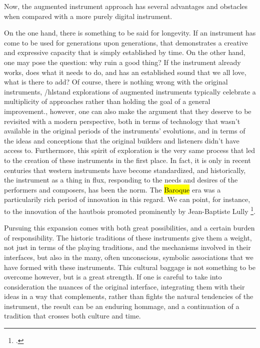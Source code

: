 \documentclass[12pt,twoside,maitrise]{dms_ks}
\theoremstyle{definition}
\begin{document}

Now, the augmented instrument approach has several advantages and obstacles when compared with a more purely digital instrument. 

On the one hand, there is something to be said for longevity.
If an instrument has come to be used for generations upon generations, that demonstrates a creative and expressive capacity that is simply established by time.
On the other hand, one may pose the question: why ruin a good thing?
If the instrument already works, does what it needs to do, and has an established sound that we all love, what is there to add?
Of course, there is nothing wrong with the original instruments, /hlst{and explorations of augmented instruments typically celebrate a multiplicity of approaches rather than holding the goal of a general improvement.}, however, one can also make the argument that they deserve to be revisited with a modern perspective, both in terms of technology that wasn't available in the original periods of the instruments' evolutions, and in terms of the ideas and conceptions that the original builders and listeners didn't have access to. 
Furthermore, this spirit of exploration is the very same process that led to the creation of these instruments in the first place.
In fact, it is only in recent centuries that western instruments have become standardized, and historically, the instrument as a thing in flux, responding to the needs and desires of the performers and composers, has been the norm.
The \hl{Baroque} era was a particularily rich period of innovation in this regard.
We can point, for instance, to the innovation of the hautbois promoted prominently by Jean-Baptiste Lully \footcite{wainwright_renaissance_2017}.


Pursuing this expansion comes with both great possibilities, and a certain burden of responsibility.
The historic traditions of these instruments give them a weight, not just in terms of the playing traditions, and the mechanisms involved in their interfaces, but also in the many, often unconscious, symbolic associations that we have formed with these instruments.
This cultural baggage is not something to be overcome however, but is a great strength.
If one is careful to take into consideration the nuances of the original interface, integrating them with their ideas in a way that complements, rather than fights the natural tendencies of the instrument, the result can be an enduring hommage, and a continuation of a tradition that crosses both culture and time.
\end{document}
